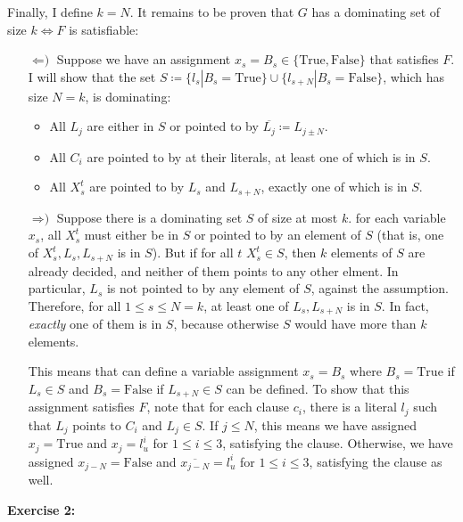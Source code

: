 \documentclass{amsart}
\theoremstyle{plain}
\theoremstyle{definition}
\begin{document}
    Finally, I define $k = N$.
    It remains to be proven that $G$ has a dominating set of size $k \iff F$ is satisfiable:


    \begin{itemize}

        \item[$\Longleftarrow\text{)}$] Suppose we have an assignment $x_s = B_s \in \{\text{True}, \text{False}\}$
        that satisfies $F$.
        I will show that the set $S \coloneqq \{l_s | B_s = \text{True}\} \cup \{l_{s+N} | B_s = \text{False}\}$,
        which has size $N=k$, is dominating:
        \begin{itemize}
            \item All $L_j$ are either in $S$ or pointed to by $ \overline{L_j} \coloneqq L_{j \pm N}$.
            \item All $C_i$ are pointed to by at their literals, at least one of which is in $S$.
            \item All $X_s^t$ are pointed to by $L_s$ and $L_{s+N}$, exactly one of which is in $S$.
        \end{itemize}

        \item[$\Longrightarrow\text{)}$] Suppose there is a dominating set $S$ of size at most $k$.
        for each variable $x_s$, all $X^t_s$ must either be in $S$ or pointed to by an element of $S$
        (that is, one of $X^t_s, L_s, L_{s+N}$ is in $S$). But if for all $t$ $X^t_s \in S$,
        then $k$ elements of $S$ are already decided, and neither of them points to any other elment.
        In particular, $L_s$ is not pointed to by any element of $S$, against the assumption.
        Therefore, for all $1 \leq s \leq N = k$, at least one of $L_s, L_{s+N}$ is in $S$.
        In fact, \emph{exactly} one of them is in $S$, because otherwise $S$ would have more than $k$ elements.

        This means that can define a variable assignment $x_s = B_s$ where $B_s = \text{True}$
        if $L_s \in S$ and $B_s = \text{False}$ if $L_{s+N} \in S$ can be defined.
        To show that this assignment satisfies $F$, note that for each clause $c_i$, there is
        a literal $l_j$ such that $L_j$ points to $C_i$ and $L_j \in S$.
        If $j \leq N$, this means we have assigned $x_j = \text{True}$ and $x_j = l^i_u$ for $1 \leq i \leq 3$,
        satisfying the clause.
        Otherwise, we have assigned $x_{j-N} = \text{False}$ and $\overline{x_{j-N}} = l^i_u$ for $1 \leq i \leq 3$,
        satisfying the clause as well.

    \end{itemize}
    
    \textbf{Exercise 2:}


    \nocite{*}
    
    
\end{document}
